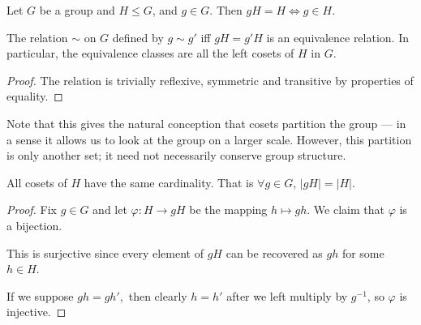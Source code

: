 \begin{corollary}
  Let $G$ be a group and $H\leq G$, and $g\in G$. Then $gH=H \iff g\in H$.
\end{corollary}

\begin{corollary}
  The relation $\sim$ on $G$ defined by $g\sim g'$ iff $gH=g'H$ is an equivalence relation.
  In particular, the equivalence classes are all the left cosets of $H$ in $G$.
  \label{leftCosetsEqRel}
\end{corollary}

\begin{proof}
     The relation is trivially reflexive, symmetric and transitive by properties of equality.
\end{proof}

\begin{remark}
  Note that this gives the natural conception that cosets partition the group --- in a sense it allows us to look at the group on a larger scale. However, this partition is only another set; it need not necessarily conserve group structure.
\end{remark}


\begin{theorem}
  All cosets of $H$ have the same cardinality. That is $\forall g\in G$, $|gH|=|H|$.
  \label{cosetsCardinality}
\end{theorem}
\begin{proof}

  Fix $g \in G$ and let $\varphi:H \longrightarrow gH$ be the mapping $h \longmapsto gh$. We claim that $\varphi$ is a bijection.

  This is surjective since every element of $gH$ can be recovered as $gh$ for some $h \in H$.

  If we suppose $gh = gh',$ then clearly $h = h'$ after we left multiply by $g^{-1}$, so $\varphi$ is injective.
\end{proof}
